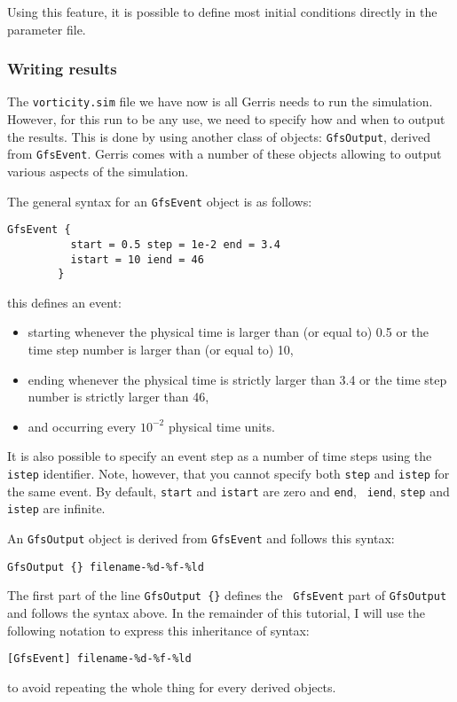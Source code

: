 \documentclass[a4paper]{article}
\begin{document}
Using this feature, it is possible to define most initial conditions directly in the parameter file.

\subsubsection{Writing results}

The {\tt vorticity.sim} file we have now is all Gerris needs to run the
simulation. However, for this run to be any use, we need to specify
how and when to output the results. This is done by using another
class of objects: {\tt GfsOutput}, derived from {\tt GfsEvent}. Gerris
comes with a number of these objects allowing to output various
aspects of the simulation.

The general syntax for an {\tt GfsEvent} object is as follows:
\begin{verbatim}
GfsEvent {
          start = 0.5 step = 1e-2 end = 3.4
          istart = 10 iend = 46
        }
\end{verbatim}
this defines an event:
\begin{itemize}
\item starting whenever the physical time is larger
than (or equal to) 0.5 or the time step number is larger than (or
equal to) 10,
\item ending whenever the physical time is strictly larger than 3.4 or 
the time step number is strictly larger than 46,
\item and occurring every $10^{-2}$ physical time units.
\end{itemize}
It is also possible to specify an event step as a number of time steps 
using the {\tt istep} identifier. Note, however, that you cannot
specify both {\tt step} and {\tt istep} for the same event. By
default, {\tt start} and {\tt istart} are zero and {\tt end}, {\tt
iend}, {\tt step} and {\tt istep} are infinite.

An {\tt GfsOutput} object is derived from {\tt GfsEvent} and follows this 
syntax:
\begin{verbatim}
GfsOutput {} filename-%d-%f-%ld
\end{verbatim}
The first part of the line {\tt GfsOutput \{\}} defines the {\tt
GfsEvent} part of {\tt GfsOutput} and follows the syntax above. In the
remainder of this tutorial, I will use the following notation to
express this inheritance of syntax:
\begin{verbatim}
[GfsEvent] filename-%d-%f-%ld
\end{verbatim}
to avoid repeating the whole thing for every derived objects.
\end{document}
